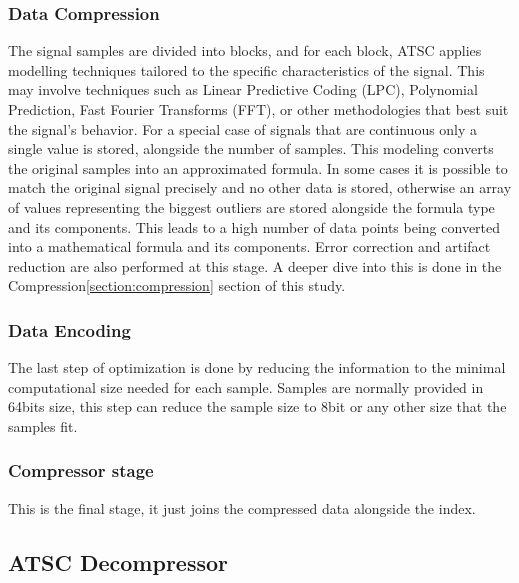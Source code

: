 \documentclass[conference]{IEEEtran}
\begin{document}
\subsubsection{Data Compression}
The signal samples are divided into blocks, and for each block, ATSC applies modelling techniques tailored to the specific characteristics of the signal. 
This may involve techniques such as Linear Predictive Coding (LPC), Polynomial Prediction, Fast Fourier Transforms (FFT), or other methodologies that best suit the signal's behavior. 
For a special case of signals that are continuous only a single value is stored, alongside the number of samples.
This modeling converts the original samples into an approximated formula.
In some cases it is possible to match the original signal precisely and no other data is stored, otherwise an array of values representing the biggest outliers are stored alongside the formula type and its components.
This leads to a high number of data points being converted into a mathematical formula and its components.
Error correction and artifact reduction are also performed at this stage.
A deeper dive into this is done in the Compression\ref{section:compression} section of this study.

\subsubsection{Data Encoding}
The last step of optimization is done by reducing the information to the minimal computational size needed for each sample. 
Samples are normally provided in 64bits size, this step can reduce the sample size to 8bit or any other size that the samples fit.

\subsubsection{Compressor stage}
This is the final stage, it just joins the compressed data alongside the index.

\subsection{ATSC Decompressor}
\end{document}
